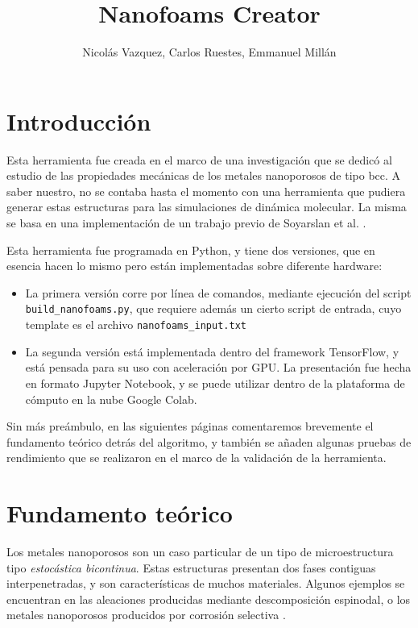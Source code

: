 \documentclass{article}
\title{Nanofoams Creator}
\author{Nicolás Vazquez, Carlos Ruestes, Emmanuel Millán}
\begin{document}
\maketitle
\tableofcontents

\section{Introducción}

Esta herramienta fue creada en el marco de una investigación que se dedicó al estudio de las propiedades mecánicas de los metales nanoporosos de tipo bcc. A saber nuestro, no se contaba hasta el momento con una herramienta que pudiera generar estas estructuras para las simulaciones de dinámica molecular. La misma se basa en una implementación de un trabajo previo de Soyarslan et al. \cite{Soyarslan2018}. 

Esta herramienta fue programada en Python, y tiene dos versiones, que en esencia hacen lo mismo pero están implementadas sobre diferente hardware: 

\begin{itemize}
    \item La primera versión corre por línea de comandos, mediante ejecución del script \verb+build_nanofoams.py+, que requiere además un cierto script de entrada, cuyo template es el archivo \verb+nanofoams_input.txt+
    \item La segunda versión está implementada dentro del framework TensorFlow, y está pensada para su uso con aceleración por GPU. La presentación fue hecha en formato Jupyter Notebook, y se puede utilizar dentro de la plataforma de cómputo en la nube Google Colab. 
\end{itemize}

Sin más preámbulo, en las siguientes páginas comentaremos brevemente el fundamento teórico detrás del algoritmo, y también se añaden algunas pruebas de rendimiento que se realizaron en el marco de la validación de la herramienta. 

\section{Fundamento teórico} \label{cap:Generacion_muestras}

Los metales nanoporosos son un caso particular de un tipo de microestructura tipo \textit{estocástica bicontinua}. Estas estructuras presentan dos fases contiguas interpenetradas, y son características de muchos materiales. Algunos ejemplos se encuentran en las aleaciones producidas mediante descomposición espinodal, o los metales nanoporosos producidos por corrosión selectiva \cite{Weissmuller2009}. 
\end{document}
